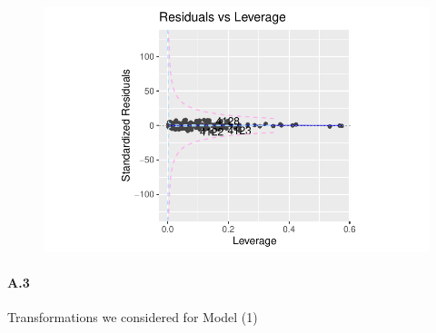 \documentclass[
  letterpaper,
  DIV=11,
  numbers=noendperiod]{scrartcl}
\let\oldparagraph\paragraph
\renewcommand{\paragraph}[1]{\oldparagraph{#1}\mbox{}}
\begin{document}
\begin{figure}[H]

{\centering \includegraphics{seoul_files/figure-pdf/unnamed-chunk-12-2.pdf}

}

\end{figure}

\hypertarget{a3}{%
\paragraph{A.3}\label{a3}}

Transformations we considered for Model (1)
\end{document}
